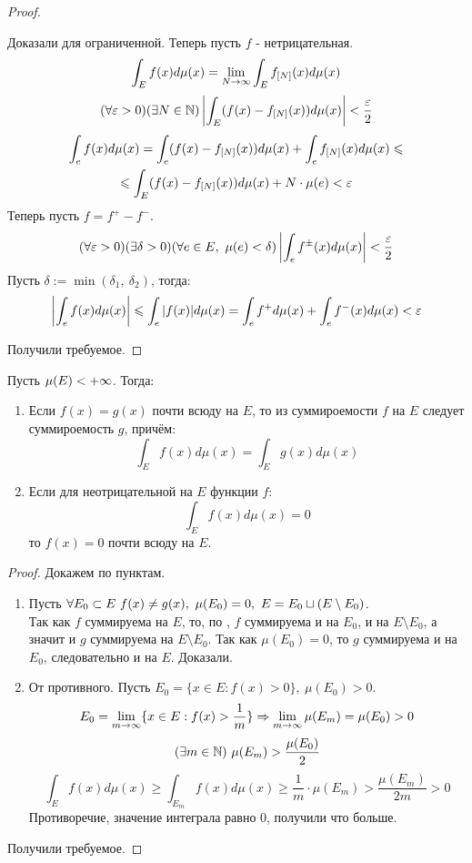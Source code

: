 \begin{proof}
\begin{enumerate}
		Доказали для ограниченной. Теперь пусть $f$ - нетрицательная.
		\[\int_Ef(x)d\mu(x)=\lim_{N\ra\i}\int_E\sr(x)d\mu(x)\]
		\[(\forall\varepsilon>0)(\exists N\in\mathbb{N})\left|\int_E(f(x)-{f_{[{N}]}}(x))d\mu(x)\right|<\frac{\varepsilon}2\]
		\begin{multline*}
			\int_ef(x)d\mu(x)=\int_e(f(x)-{f_{[{N}]}}(x))d\mu(x)+\int_e{f_{[{N}]}}(x)d\mu(x)\leqslant\\
			\leqslant\int_E(f(x)-{f_{[{N}]}}(x))d\mu(x)+N\cdot\mu(e)<\varepsilon
		\end{multline*}
		Теперь пусть $f=f^+-f^-$.
		\[(\fa\eps>0)(\ex\delta>0)(\fa e\in E,\ \mu(e)<\delta)\l|\int_ef^\pm(x)d\mu(x)\r|<\frac\eps2\]
		Пусть $\delta:=\min(\delta_1,\ \delta_2)$, тогда:
		\[\left|\int_ef(x)d\mu(x)\right|\leqslant\int_e|f(x)|d\mu(x)=\int_ef^+d\mu(x)+\int_ef^-(x)d\mu(x)<\varepsilon\]
	\end{enumerate}
	Получили требуемое.
\end{proof}
\begin{corollary}
	Пусть $\mu(E)<{+\infty}$. Тогда:
	\begin{enumerate}
		\item Если $f(x)=g(x)$ почти всюду на $E$, то из суммироемости $f$ на $E$ следует суммироемость $g$, причём:
		\[\int_Ef(x)d\mu(x)=\int_Eg(x)d\mu(x)\]
		\item Если для неотрицательной на $E$ функции $f$:
		\[\int_Ef(x)d\mu(x)=0\]
		то $f(x)=0$ почти всюду на $E$.
	\end{enumerate}
\end{corollary}
\begin{proof}
	Докажем по пунктам.
	\begin{enumerate}
		\item Пусть $\fa E_0\subset E\ f(x)\ne g(x),\ \mu(E_0)=0,\ E=E_0\sc(E\setminus E_0)$.\\
		Так как $f$ суммируема на $E$, то, по , $f$ суммируема и на $E_0$, и на $E\setminus E_0$, а значит и $g$ суммируема на $E\setminus E_0$. Так как $\mu(E_0)=0$, то $g$ суммируема и на $E_0$, следовательно и на $E$. Доказали.
		\item От противного. Пусть $E_0=\{x\in E:f(x)>0\},\ \mu(E_0)>0$.
		\[E_0=\lim_{m\ra\i}\{x\in E:f(x)>\frac1m\}\Ra\lim_{m\ra\i}\mu(E_m)=\mu(E_0)>0\]
		\[(\ex m\in\N)\ \mu(E_m)>\frac{\mu(E_0)}2\]
		\[\int_Ef(x)d\mu(x)\ge\int_{E_m}f(x)d\mu(x)\ge\frac1m\cdot\mu(E_m)>\frac{\mu(E_m)}{2m}>0\]
		Противоречие, значение интеграла равно 0, получили что больше.
	\end{enumerate}
	Получили требуемое.
\end{proof}
